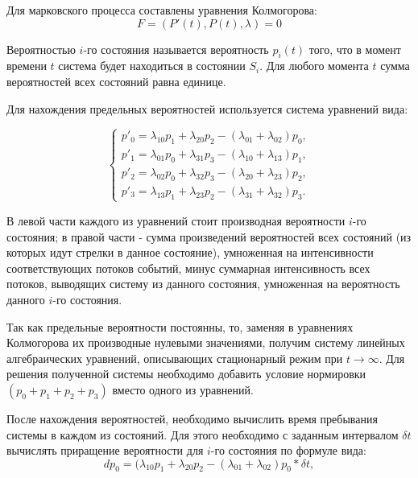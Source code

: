 \documentclass[12pt]{report}
\begin{document}
Для марковского процесса составлены уравнения Колмогорова:
$$F=(P'(t), P(t), \lambda)=0$$


Вероятностью $i$-го состояния называется вероятность $p_i(t)$ того, что в момент времени $t$ система будет находиться в состоянии $S_i$. Для любого момента $t$ сумма вероятностей всех состояний равна единице. 

Для нахождения предельных вероятностей используется система уравнений вида:

\begin{equation*}
 \begin{cases}
   p'_0 = \lambda_{10}p_1 + \lambda_{20}p_2 - (\lambda_{01} + \lambda_{02})p_0,
   \\
  p'_1 = \lambda_{01}p_0 + \lambda_{31}p_3 - (\lambda_{10} + \lambda_{13})p_1,
   \\
  p'_2 = \lambda_{02}p_0 + \lambda_{32}p_3 - (\lambda_{20} + \lambda_{23})p_2,
  \\
  p'_3 = \lambda_{13}p_1 + \lambda_{23}p_2 - (\lambda_{31} + \lambda_{32})p_3.
 \end{cases}
\end{equation*}
\newline


В левой части каждого из уравнений стоит производная вероятности $i$-го состояния; в правой части - сумма произведений вероятностей всех состояний (из которых идут стрелки в данное состояние), умноженная на интенсивности соответствующих потоков событий, минус суммарная интенсивность всех потоков, выводящих систему из данного состояния, умноженная на вероятность данного $i$-го состояния.
\newline


Так как предельные вероятности постоянны, то, заменяя в уравнениях Колмогорова их производные нулевыми значениями, получим систему линейных алгебраических уравнений, описывающих стационарный режим при $t \rightarrow \infty$.
Для решения полученной системы необходимо добавить условие нормировки $(p_0 + p_1 + p_2 + p_3)$ вместо одного из уравнений.
\newline


После нахождения вероятностей, необходимо вычислить время пребывания системы в каждом из состояний. Для этого необходимо с заданным интервалом $\delta t$ вычислять приращение вероятности для $i$-го состояния по формуле вида:
\begin{equation*}
   dp_0 = (\lambda_{10}p_1 + \lambda_{20}p_2 - (\lambda_{01} + \lambda_{02})p_0 * \delta t,
\end{equation*}
\end{document}
